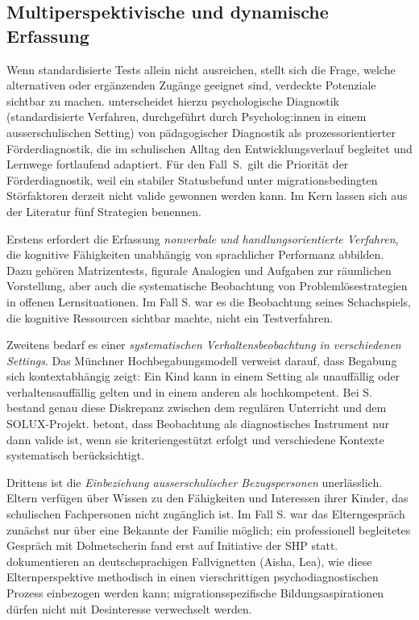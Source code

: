 \documentclass[ngerman, a4paper]{article}
\begin{document}
\subsection{Multiperspektivische und dynamische Erfassung}

Wenn standardisierte Tests allein nicht ausreichen, stellt sich die Frage, welche
alternativen oder ergänzenden Zugänge geeignet sind, verdeckte Potenziale sichtbar
zu machen. \textcite[S.\,224--238]{muelleroppliger2021paeddiagnostik} unterscheidet
hierzu psychologische Diagnostik (standardisierte Verfahren, durchgeführt durch
Psycholog:innen in einem ausserschulischen Setting) von pädagogischer Diagnostik
als prozessorientierter Förderdiagnostik, die im schulischen Alltag den
Entwicklungsverlauf begleitet und Lernwege fortlaufend adaptiert. Für den Fall~S.\
gilt die Priorität der Förderdiagnostik, weil ein stabiler Statusbefund unter
migrationsbedingten Störfaktoren derzeit nicht valide gewonnen werden kann.
Im Kern lassen sich aus der Literatur fünf Strategien benennen.

Erstens erfordert die Erfassung \textit{nonverbale und handlungsorientierte Verfahren}, die
kognitive Fähigkeiten unabhängig von sprachlicher Performanz abbilden. Dazu gehören
Matrizentests, figurale Analogien und Aufgaben zur räumlichen Vorstellung, aber auch
die systematische Beobachtung von Problemlösestrategien in offenen Lernsituationen.
Im Fall S. war es die Beobachtung seines Schachspiels, die kognitive Ressourcen sichtbar
machte, nicht ein Testverfahren.

Zweitens bedarf es einer \textit{systematischen Verhaltensbeobachtung in verschiedenen
Settings}. Das Münchner Hochbegabungsmodell verweist darauf, dass Begabung sich
kontextabhängig zeigt: Ein Kind kann in einem Setting als unauffällig oder
verhaltensauffällig gelten und in einem anderen als hochkompetent. Bei S. bestand genau
diese Diskrepanz zwischen dem regulären Unterricht und dem SOLUX-Projekt.
\textcite[S.\,34--41]{trautmann2016einfuehrung} betont, dass Beobachtung als diagnostisches Instrument nur dann valide
ist, wenn sie kriteriengestützt erfolgt und verschiedene Kontexte systematisch
berücksichtigt.

Drittens ist die \textit{Einbeziehung ausserschulischer Bezugspersonen} unerlässlich.
Eltern verfügen über Wissen zu den Fähigkeiten und Interessen ihrer Kinder, das
schulischen Fachpersonen nicht zugänglich ist. Im Fall S. war das Elterngespräch zunächst
nur über eine Bekannte der Familie möglich; ein professionell begleitetes Gespräch mit
Dolmetscherin fand erst auf Initiative der SHP statt.
\textcite[S.\,239--247]{gauckreimann2021psychdiagnostik} dokumentieren an
deutschsprachigen Fallvignetten (Aisha, Lea), wie diese Elternperspektive
methodisch in einen vier­schrittigen psychodiagnostischen Prozess
einbezogen werden kann; migrationsspezifische Bildungsaspirationen dürfen
nicht mit Desinteresse verwechselt werden.
\end{document}
